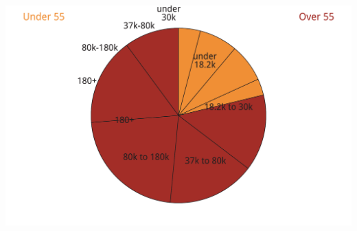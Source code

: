 \documentclass[tikz]{standalone}\usepackage[]{graphicx}\usepackage[]{color}
\newenvironment{knitrout}{}{} %
\begin{document}
\begin{knitrout}
\color{fgcolor}
\includegraphics[width=11.000in,height=7.00in]{./Super-tax-targeting/b5-super-atlas/Figure5-1-1} 

\end{knitrout}
\end{document}
